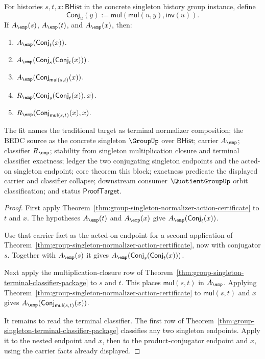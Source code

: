 \begin{theorem}
\label{thm:group-singleton-normalizer-action-composition-collapse}
For histories $s,t,x:\mathsf{BHist}$ in the concrete singleton history group
instance, define
$$
\mathsf{Conj}_u(y):=\mathsf{mul}(\mathsf{mul}(u,y),\mathsf{inv}(u)).
$$
If $A_{\emp}(s)$, $A_{\emp}(t)$, and $A_{\emp}(x)$, then:
\begin{enumerate}
\item $A_{\emp}(\mathsf{Conj}_t(x))$.
\item $A_{\emp}(\mathsf{Conj}_s(\mathsf{Conj}_t(x)))$.
\item $A_{\emp}(\mathsf{Conj}_{\mathsf{mul}(s,t)}(x))$.
\item $R_{\emp}(\mathsf{Conj}_s(\mathsf{Conj}_t(x)),x)$.
\item $R_{\emp}(\mathsf{Conj}_{\mathsf{mul}(s,t)}(x),x)$.
\end{enumerate}
The fit names the traditional target as terminal normalizer composition; the
BEDC source as the concrete singleton $\GroupUp$ over $\mathsf{BHist}$; carrier
$A_{\emp}$; classifier $R_{\emp}$; stability from singleton multiplication
closure and terminal classifier exactness; ledger the two conjugating singleton
endpoints and the acted-on singleton endpoint; core theorem this block;
exactness predicate the displayed carrier and classifier collapse; downstream
consumer $\QuotientGroupUp$ orbit classification; and status
$\mathsf{ProofTarget}$.
\end{theorem}
\begin{proof}
First apply Theorem~\ref{thm:group-singleton-normalizer-action-certificate} to
$t$ and $x$. The hypotheses $A_{\emp}(t)$ and $A_{\emp}(x)$ give
$A_{\emp}(\mathsf{Conj}_t(x))$.

Use that carrier fact as the acted-on endpoint for a second application of
Theorem~\ref{thm:group-singleton-normalizer-action-certificate}, now with
conjugator $s$. Together with $A_{\emp}(s)$ it gives
$A_{\emp}(\mathsf{Conj}_s(\mathsf{Conj}_t(x)))$.

Next apply the multiplication-closure row of
Theorem~\ref{thm:group-singleton-terminal-classifier-package} to $s$ and $t$.
This places $\mathsf{mul}(s,t)$ in $A_{\emp}$. Applying
Theorem~\ref{thm:group-singleton-normalizer-action-certificate} to
$\mathsf{mul}(s,t)$ and $x$ gives
$A_{\emp}(\mathsf{Conj}_{\mathsf{mul}(s,t)}(x))$.

It remains to read the terminal classifier. The first row of
Theorem~\ref{thm:group-singleton-terminal-classifier-package} classifies any two
singleton endpoints. Apply it to the nested endpoint and $x$, then to the
product-conjugator endpoint and $x$, using the carrier facts already displayed.
\end{proof}

